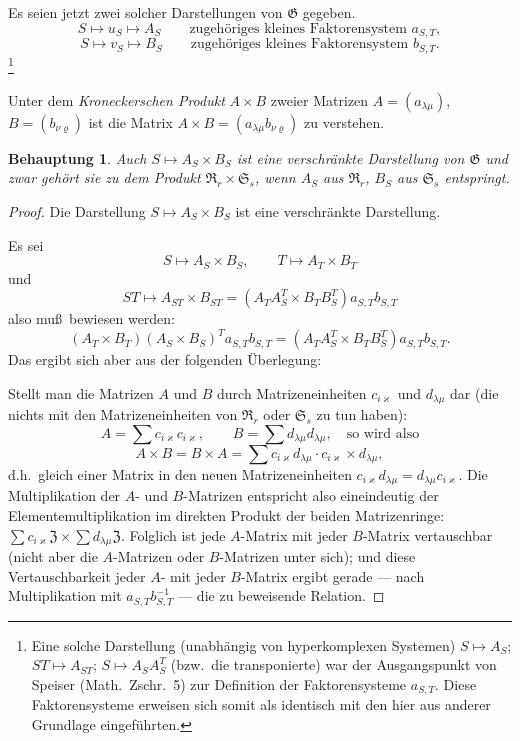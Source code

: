 \documentclass[12pt,a4paper]{article}
\theoremstyle{plain}
\newtheorem{behauptung}{Behauptung}[section]
\theoremstyle{definition}
\theoremstyle{remark}
\begin{document}
Es seien jetzt zwei solcher Darstellungen von $\mathfrak{G}$ gegeben.
\[
S \mapsto u_{S} \mapsto A_{S} \qquad \text{zugeh\"origes kleines Faktorensystem } a_{S,T},
\]
\[
S \mapsto v_{S} \mapsto B_{S} \qquad \text{zugeh\"origes kleines Faktorensystem } b_{S,T}.
\]
%
\footnote{Eine solche Darstellung (unabh\"angig von hyperkomplexen Systemen)
$S \mapsto A_{S}$; $ST \mapsto A_{ST}$; $S \mapsto A_{S}A_{S}^{T}$
(bzw.\ die transponierte) war der Ausgangspunkt von Speiser (Math.\ Zschr.\ 5)
zur Definition der Faktorensysteme $a_{S,T}$. Diese Faktorensysteme erweisen
sich somit als identisch mit den hier aus anderer Grundlage eingef\"uhrten.}

Unter dem \textit{Kroneckerschen Produkt} $A \times B$ zweier Matrizen
$A = (a_{\lambda\mu})$, $B = (b_{\nu\varrho})$ ist die Matrix
$A \times B = (a_{\lambda\mu}b_{\nu\varrho})$ zu verstehen.

\begin{behauptung}
Auch $S \mapsto A_{S} \times B_{S}$ ist eine verschr\"ankte Darstellung von
$\mathfrak{G}$ und zwar geh\"ort sie zu dem Produkt $\mathfrak{R}_{r} \times \mathfrak{S}_{s}$,
wenn $A_{S}$ aus $\mathfrak{R}_{r}$, $B_{S}$ aus $\mathfrak{S}_{s}$ entspringt.
\end{behauptung}

\begin{proof}
Die Darstellung $S \mapsto A_{S} \times B_{S}$ ist eine verschr\"ankte Darstellung.

Es sei
\[
S \mapsto A_{S} \times B_{S}, \qquad T \mapsto A_{T} \times B_{T}
\]
und
\[
ST \mapsto A_{ST} \times B_{ST} = (A_{T}A_{S}^{T} \times B_{T}B_{S}^{T})a_{S,T}b_{S,T}
\]
also mu\ss\ bewiesen werden:
\[
(A_{T} \times B_{T})(A_{S} \times B_{S})^{T}a_{S,T}b_{S,T}
= (A_{T}A_{S}^{T} \times B_{T}B_{S}^{T})a_{S,T}b_{S,T}.
\]
Das ergibt sich aber aus der folgenden \"Uberlegung:

Stellt man die Matrizen $A$ und $B$ durch Matrizeneinheiten
$c_{i\varkappa}$ und $d_{\lambda\mu}$ dar (die nichts mit den Matrizeneinheiten von
$\mathfrak{R}_{r}$ oder $\mathfrak{S}_{s}$ zu tun haben):
\[
A = \sum c_{i\varkappa}c_{i\varkappa}, \qquad B = \sum d_{\lambda\mu}d_{\lambda\mu}, \quad \text{so wird also}
\]
\[
A \times B = B \times A = \sum c_{i\varkappa}d_{\lambda\mu} \cdot c_{i\varkappa} \times d_{\lambda\mu},
\]
d.h.\ gleich einer Matrix in den neuen Matrizeneinheiten
$c_{i\varkappa}d_{\lambda\mu} = d_{\lambda\mu}c_{i\varkappa}$. Die Multiplikation der $A$- und $B$-Matrizen
entspricht also eineindeutig der Elementemultiplikation im direkten
Produkt der beiden Matrizenringe:
$\sum c_{i\varkappa}\mathfrak{Z} \times \sum d_{\lambda\mu}\mathfrak{Z}$. Folglich ist jede $A$-Matrix
mit jeder $B$-Matrix vertauschbar (nicht aber die $A$-Matrizen oder
$B$-Matrizen unter sich); und diese Vertauschbarkeit jeder $A$- mit
jeder $B$-Matrix ergibt gerade --- nach Multiplikation mit
$a_{S,T}b_{S,T}^{-1}$ --- die zu beweisende Relation.
\end{proof}
\end{document}
